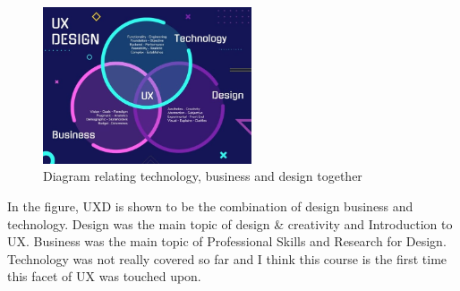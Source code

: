 \begin{figure}[H]
    \centering
    \includegraphics[width = 0.55\textwidth]{Figures/reflection/venn_diagram.jpg}
    \caption{Diagram relating technology, business and design together}
    \label{fig: venn diagram}
\end{figure}

In the figure, UXD is shown to be the combination of design business and technology. Design was the main topic of design \& creativity and Introduction to UX. Business was the main topic of Professional Skills and Research for Design. Technology was not really covered so far and I think this course is the first time this facet of UX was touched upon. 